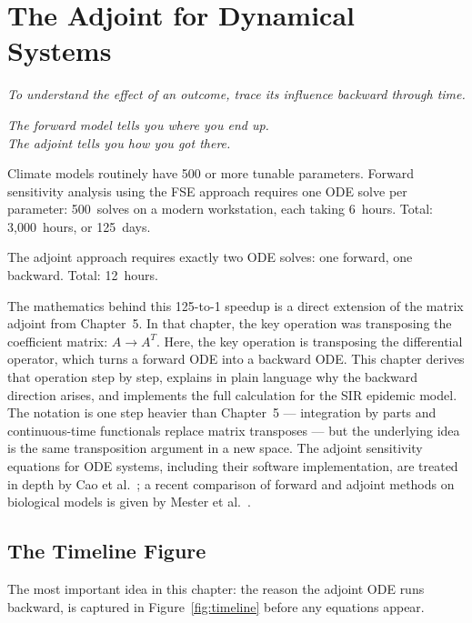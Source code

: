 \chapter{The Adjoint for Dynamical Systems}

\begin{flushright}
\textit{To understand the effect of an outcome, trace its influence backward through time.}

\medskip
\textit{The forward model tells you where you end up.\\
The adjoint tells you how you got there.}
\end{flushright}

\bigskip

Climate models routinely have 500 or more tunable parameters.
Forward sensitivity analysis using the FSE approach requires
one ODE solve per parameter: 500~solves on a modern workstation,
each taking 6~hours. Total: 3{,}000~hours, or 125~days.

The adjoint approach requires exactly two ODE solves: one forward,
one backward. Total: 12~hours.

The mathematics behind this 125-to-1 speedup is a direct extension
of the matrix adjoint from Chapter~5. In that chapter, the key operation
was transposing the coefficient matrix: $A \to A^T$. Here, the key
operation is transposing the differential operator, which turns a forward
ODE into a backward ODE. This chapter derives that operation step by step,
explains in plain language why the backward direction arises,
and implements the full calculation for the SIR epidemic model.
The notation is one step heavier than Chapter~5 --- integration by parts
and continuous-time functionals replace matrix transposes --- but the
underlying idea is the same transposition argument in a new space.
The adjoint sensitivity equations for ODE systems, including their
software implementation, are treated in depth by Cao et al.~\cite{cao2002adjoint};
a recent comparison of forward and adjoint methods on biological models is
given by Mester et al.~\cite{mester2022differential}.

\section{The Timeline Figure}
\label{sec:timeline}

The most important idea in this chapter: the reason the adjoint ODE
runs backward, is captured in Figure~\ref{fig:timeline} before any
equations appear.

